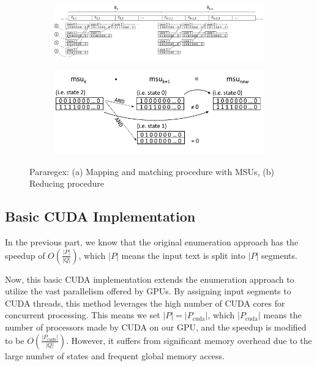 \documentclass[sigconf]{acmart}
\begin{document}
\begin{figure}[t]
	\begin{subfigure}{.6\textwidth}
		\centering
		\includegraphics[width=\linewidth]{Pararegex_1}
		\caption{}
		\label{fig:Pararegex_1}
	\end{subfigure}
	\begin{subfigure}{.3\textwidth}
		\centering
		\includegraphics[width=\linewidth]{Pararegex_2}
		\caption{}
		\label{fig:Pararegex_2}
	\end{subfigure}
	\caption{Pararegex: (a) Mapping and matching procedure with MSUs, (b) Reducing procedure}
\end{figure}

\subsection{Basic CUDA Implementation}
In the previous part, we know that the original enumeration approach has the speedup of $O\left(\frac{|P|}{|Q|}\right)$, which $|P|$ means the input text is split into $|P|$ segments.

Now, this basic CUDA implementation extends the enumeration approach to utilize the vast parallelism offered by GPUs. By assigning input segments to CUDA threads, this method leverages the high number of CUDA cores for concurrent processing. This means we set $|P| = |P_{\text{cuda}}|$, which $|P_{\text{cuda}}|$ means the number of processors made by CUDA on our GPU, and the speedup is modified to be $O\left(\frac{|P_{cuda}|}{|Q|}\right)$. However, it suffers from significant memory overhead due to the large number of states and frequent global memory access.
\end{document}
